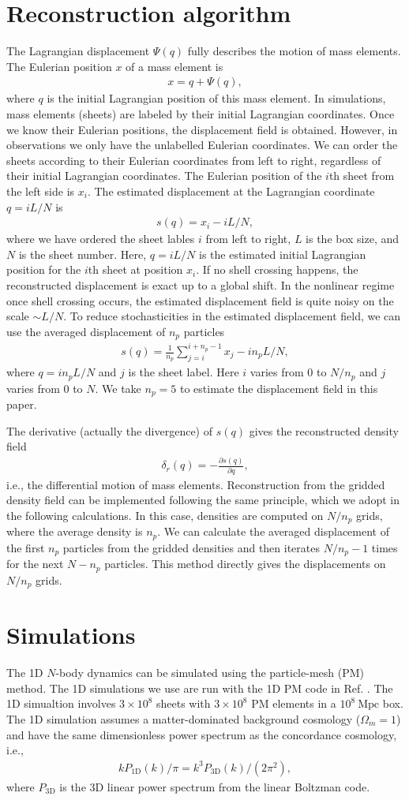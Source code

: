 \documentclass[aps,prd,twocolumn,showpacs,superscriptaddress,groupedaddress,nofootinbib]{revtex4}  %
\newcommand{\mr}{\mathrm}
\newcommand{\bea}{\begin{eqnarray}}
\newcommand{\eea}{\end{eqnarray}}
\begin{document}
\section{Reconstruction algorithm}
\label{rec}
The Lagrangian displacement 
${\Psi}({q})$ fully describes the motion of mass elements.
The Eulerian position ${x}$ of a mass element is
\bea
{x}={q}+{\Psi}({q}),
\eea
where ${q}$ is the initial Lagrangian position of this mass element.
In simulations, mass elements (sheets) are labeled by their initial 
Lagrangian coordinates. Once we know their Eulerian positions, the displacement 
field is obtained. However, in observations we only have the unlabelled 
Eulerian coordinates. 
We can order the sheets according to their Eulerian coordinates from left to 
right, regardless of their initial Lagrangian coordinates.
The Eulerian position of the $i$th sheet from the left side is $x_i$.
The estimated displacement at the Lagrangian coordinate $q=iL/N$ is 
\bea
s(q)=x_i-iL/N,
\eea
where we have ordered the sheet lables $i$ from left to right, $L$ is the box
size, and $N$ is the sheet number. 
Here, $q=iL/N$ is the estimated initial Lagrangian position for the $i$th sheet
at position $x_i$.
If no shell crossing happens, the reconstructed displacement is exact up to
a global shift. In the nonlinear regime once shell crossing occurs, the 
estimated displacement field is quite noisy on the scale $\sim L/N$.
To reduce stochasticities in the estimated displacement field, we can use the
averaged displacement of $n_p$ particles 
\bea
s(q)=\frac{1}{n_p}\sum_{j=i}^{i+n_p-1}x_{j}-in_pL/N,
\eea
where $q=in_pL/N$ and $j$ is the sheet label. 
Here $i$ varies from $0$ to $N/n_p$ and $j$ varies from $0$ to $N$.
We take $n_p=5$ to estimate the displacement field in this paper.

The derivative (actually the divergence) of $s(q)$ gives the reconstructed 
density field 
\bea
\delta_r({q})=-\frac{\partial s(q)}{\partial q},
\eea
i.e., the differential motion of mass elements. 
Reconstruction from the gridded density field can be implemented following
the same principle, which we adopt in the following calculations.
In this case, densities are computed on $N/n_p$ grids, where the average 
density is $n_p$. We can calculate the averaged displacement of the first $n_p$ 
particles from the gridded densities and then iterates $N/n_p-1$ times for the
next $N-n_p$ particles. 
This method directly gives the displacements on $N/n_p$ grids. 

\section{Simulations}
\label{sim}
The 1D $N$-body dynamics can be simulated using the particle-mesh (PM) method.
The 1D simulations we use are run with the 1D PM code in Ref. \cite{2016matt}.
The 1D simualtion involves $3\times10^8$ sheets with $3\times10^8$ PM elements 
in a $10^8\ \mr{Mpc}$ box. The 1D simulation assumes a matter-dominated 
background cosmology ($\Omega_m=1$) and have the same dimensionless power 
spectrum as the concordance cosmology, i.e., 
\bea
kP_\mr{1D}(k)/\pi=k^3P_\mr{3D}(k)/(2\pi^2),
\eea
where $P_\mr{3D}$ is the 3D linear power spectrum from the linear Boltzman code.
\end{document}
